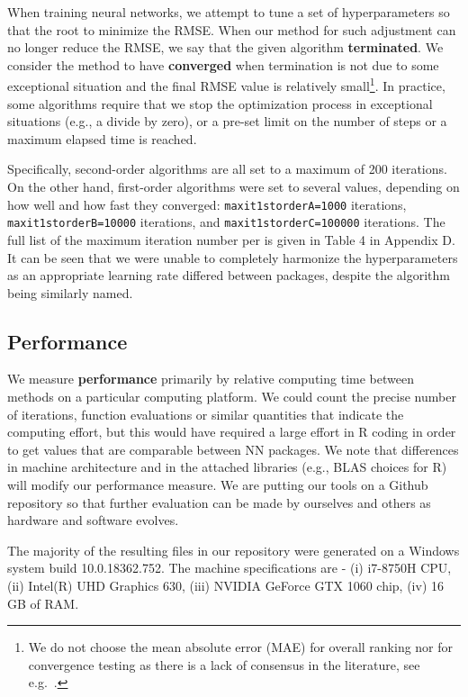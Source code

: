 When training neural networks, we attempt to tune a set of
hyperparameters so that the root to minimize the RMSE. When our method
for such adjustment can no longer reduce the RMSE, we say that the given
algorithm \textbf{terminated}. We consider the method to have
\textbf{converged} when termination is not due to some exceptional
situation and the final RMSE value is relatively small\footnote{We do
  not choose the mean absolute error (MAE) for overall ranking nor for
  convergence testing as there is a lack of consensus in the literature,
  see e.g.~\citep{willmott2005advantages,chai2014root}.}. In practice,
some algorithms require that we stop the optimization process in
exceptional situations (e.g., a divide by zero), or a pre-set limit on
the number of steps or a maximum elapsed time is reached.

Specifically, second-order algorithms are all set to a maximum of 200
iterations. On the other hand, first-order algorithms were set to
several values, depending on how well and how fast they converged:
\texttt{maxit1storderA=1000} iterations, \texttt{maxit1storderB=10000}
iterations, and \texttt{maxit1storderC=100000} iterations. The full list
of the maximum iteration number per  is given in
Table 4 in Appendix D. It can be seen that we were unable to completely
harmonize the hyperparameters as an appropriate learning rate differed
between packages, despite the algorithm being similarly named.

\hypertarget{performance}{%
\subsection{Performance}\label{performance}}

We measure \textbf{performance} primarily by relative computing time
between methods on a particular computing platform. We could count the
precise number of iterations, function evaluations or similar quantities
that indicate the computing effort, but this would have required a large
effort in R coding in order to get values that are comparable between NN
packages. We note that differences in machine architecture and in the
attached libraries (e.g., BLAS choices for R) will modify our
performance measure. We are putting our tools on a Github repository so
that further evaluation can be made by ourselves and others as hardware
and software evolves.

The majority of the resulting files in our repository were generated on
a Windows system build 10.0.18362.752. The machine specifications are -
(i) i7-8750H CPU, (ii) Intel(R) UHD Graphics 630, (iii) NVIDIA GeForce
GTX 1060 chip, (iv) 16 GB of RAM.

